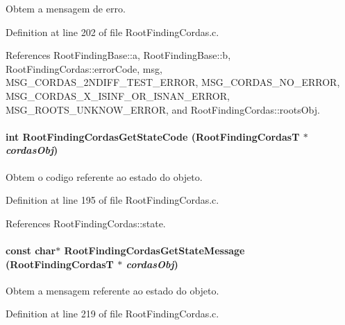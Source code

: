 Obtem a mensagem de erro. 



Definition at line 202 of file RootFindingCordas.c.

References RootFindingBase::a, RootFindingBase::b, RootFindingCordas::errorCode, msg, MSG\_\-CORDAS\_\-2NDIFF\_\-TEST\_\-ERROR, MSG\_\-CORDAS\_\-NO\_\-ERROR, MSG\_\-CORDAS\_\-X\_\-ISINF\_\-OR\_\-ISNAN\_\-ERROR, MSG\_\-ROOTS\_\-UNKNOW\_\-ERROR, and RootFindingCordas::rootsObj.\hypertarget{group____cordas_g67aaf428f922e7d15a7fbd5a4508ffd7}{
\paragraph[RootFindingCordasGetStateCode]{\setlength{\rightskip}{0pt plus 5cm}int RootFindingCordasGetStateCode ({\bf RootFindingCordasT} $\ast$ {\em cordasObj})}\hfill}
\label{group____cordas_g67aaf428f922e7d15a7fbd5a4508ffd7}


Obtem o codigo referente ao estado do objeto. 



Definition at line 195 of file RootFindingCordas.c.

References RootFindingCordas::state.\hypertarget{group____cordas_ga065f13f2ec77b2e949190c1aca9ef9d}{
\paragraph[RootFindingCordasGetStateMessage]{\setlength{\rightskip}{0pt plus 5cm}const char$\ast$ RootFindingCordasGetStateMessage ({\bf RootFindingCordasT} $\ast$ {\em cordasObj})}\hfill}
\label{group____cordas_ga065f13f2ec77b2e949190c1aca9ef9d}


Obtem a mensagem referente ao estado do objeto. 



Definition at line 219 of file RootFindingCordas.c.

